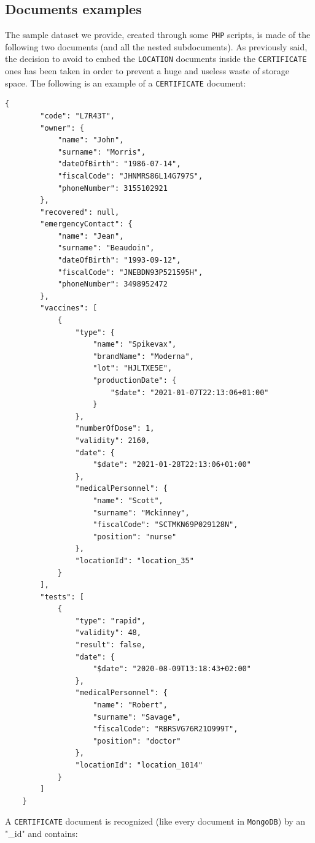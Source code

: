 \documentclass{article}
\begin{document}
\subsection{Documents examples}
The sample dataset we provide, created through some \verb|PHP| scripts, is made of the following two documents (and all the nested subdocuments). As previously said, the decision to avoid to embed the \verb|LOCATION| documents inside the \verb|CERTIFICATE| ones has been taken in order to prevent a huge and useless waste of storage space. The following is an example of a \verb|CERTIFICATE| document:
\begin{verbatim}
{
        "code": "L7R43T",
        "owner": {
            "name": "John",
            "surname": "Morris",
            "dateOfBirth": "1986-07-14",
            "fiscalCode": "JHNMRS86L14G797S",
            "phoneNumber": 3155102921
        },
        "recovered": null,
        "emergencyContact": {
            "name": "Jean",
            "surname": "Beaudoin",
            "dateOfBirth": "1993-09-12",
            "fiscalCode": "JNEBDN93P521595H",
            "phoneNumber": 3498952472
        },
        "vaccines": [
            {
                "type": {
                    "name": "Spikevax",
                    "brandName": "Moderna",
                    "lot": "HJLTXE5E",
                    "productionDate": {
                        "$date": "2021-01-07T22:13:06+01:00"
                    }
                },
                "numberOfDose": 1,
                "validity": 2160,
                "date": {
                    "$date": "2021-01-28T22:13:06+01:00"
                },
                "medicalPersonnel": {
                    "name": "Scott",
                    "surname": "Mckinney",
                    "fiscalCode": "SCTMKN69P029128N",
                    "position": "nurse"
                },
                "locationId": "location_35"
            }
        ],
        "tests": [
            {
                "type": "rapid",
                "validity": 48,
                "result": false,
                "date": {
                    "$date": "2020-08-09T13:18:43+02:00"
                },
                "medicalPersonnel": {
                    "name": "Robert",
                    "surname": "Savage",
                    "fiscalCode": "RBRSVG76R21O999T",
                    "position": "doctor"
                },
                "locationId": "location_1014"
            }
        ]
    }
\end{verbatim}
A \verb|CERTIFICATE| document is recognized (like every document in \verb|MongoDB|) by an "\_id" and contains:
\end{document}
